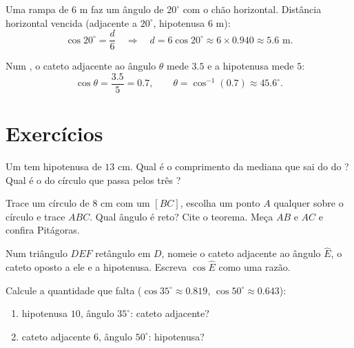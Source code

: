 \begin{example}\label{ex:g8:cosine:side}
Uma rampa de $6$ m faz um ângulo de $20^\circ$ com o chão horizontal.
Distância horizontal vencida (adjacente a $20^\circ$, hipotenusa
$6$ m):
\[
\cos 20^\circ = \frac{d}{6}
\quad\Longrightarrow\quad
d = 6 \cos 20^\circ \approx 6 \times 0.940 \approx 5.6 \text{ m}.
\]
\end{example}

\begin{example}\label{ex:g8:cosine:angle}
Num , o cateto adjacente ao ângulo $\theta$ mede
$3.5$ e a hipotenusa mede $5$:
\[
\cos\theta = \frac{3.5}{5} = 0.7,
\qquad
\theta = \cos^{-1}(0.7) \approx 45.6^\circ .
\]
\end{example}

\section{Exercícios}

\begin{exercise}[$\star$]\label{exo:g8:cosine:1}
Um  tem hipotenusa de $13$ cm. Qual é o comprimento
da mediana que sai do  do ? Qual é o  do círculo
que passa pelos três ?
\end{exercise}

\begin{exercise}[$\star$]\label{exo:g8:cosine:2}
Trace um círculo de  $8$ cm com um  $[BC]$, escolha um
ponto $A$ qualquer sobre o círculo e trace $ABC$. Qual ângulo é reto?
Cite o teorema. Meça $AB$ e $AC$ e confira Pitágoras.
\end{exercise}

\begin{exercise}[$\star$]\label{exo:g8:cosine:3}
Num triângulo $DEF$ retângulo em $D$, nomeie o cateto adjacente ao
ângulo $\widehat E$, o cateto oposto a ele e a hipotenusa. Escreva
$\cos \widehat E$ como uma razão.
\end{exercise}

\begin{exercise}[$\star$]\label{exo:g8:cosine:4}
Calcule a quantidade que falta ($\cos 35^\circ \approx 0.819$,
$\cos 50^\circ \approx 0.643$):
\begin{enumerate}
  \item hipotenusa $10$, ângulo $35^\circ$: cateto adjacente?
  \item cateto adjacente $6$, ângulo $50^\circ$: hipotenusa?
\end{enumerate}
\end{exercise}

